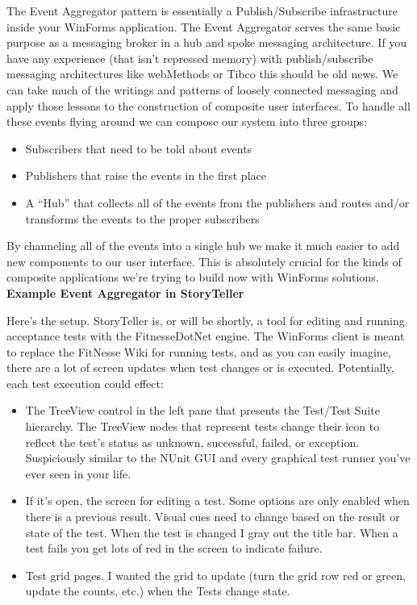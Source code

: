 \documentclass{article}
\begin{document}
{The Event Aggregator pattern is essentially a Publish/Subscribe infrastructure inside your WinForms application.  The Event Aggregator serves the same basic purpose as a messaging broker in a hub and spoke messaging architecture.   If you have any experience (that isn't repressed memory) with publish/subscribe messaging architectures like webMethods or Tibco this should be old news.  We can take much of the writings and patterns of loosely connected messaging and apply those lessons to the construction of composite user interfaces.  To handle all these events flying around we can compose our system into three groups:
 \begin{itemize}
    \item Subscribers that need to be told about events
   \item  Publishers that raise the events in the first place
    \item A “Hub” that collects all of the events from the publishers and routes and/or transforms the events to the proper subscribers
 \end{itemize}
By channeling all of the events into a single hub we make it much easier to add new components to our user interface.  This is absolutely crucial for the kinds of composite applications we're trying to build now with WinForms solutions. 
\Large {\textbf{Example Event Aggregator in StoryTeller}}

Here's the setup.  StoryTeller is, or will be shortly, a tool for editing and running acceptance tests with the FitnesseDotNet engine.  The WinForms client is meant to replace the FitNesse Wiki for running tests, and as you can easily imagine, there are a lot of screen updates when test changes or is executed.  Potentially, each test execution could effect:
 \begin{itemize}
    \item  The TreeView control in the left pane that presents the Test/Test Suite hierarchy.  The TreeView nodes that represent tests change their icon to reflect the test's status as unknown, successful, failed, or exception.  Suspiciously similar to the NUnit GUI and every graphical test runner you've ever seen in your life.  
 \item  If it's open, the screen for editing a test.  Some options are only enabled when there is a previous result.  Visual cues need to change based on the result or state of the test.  When the test is changed I gray out the title bar.  When a test fails you get lots of red in the screen to indicate failure.  
 \item  Test grid pages.  I wanted the grid to update (turn the grid row red or green, update the counts, etc.) when the Tests change state. 
 \end{itemize} 

}
\end{document}
